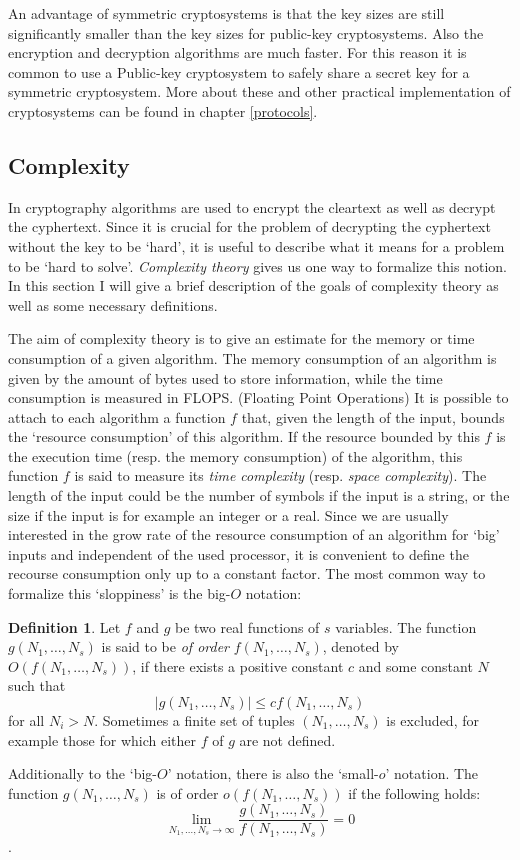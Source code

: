 \documentclass{article}
\numberwithin{equation}{section}
\theoremstyle{definition}
\newtheorem{definition}[theorem]{Definition}
\begin{document}
An advantage of symmetric cryptosystems is that the key sizes are still significantly smaller than the key sizes for public-key cryptosystems. Also the encryption and decryption algorithms are much faster. For this reason it is common to use a Public-key cryptosystem to safely share a secret key for a symmetric cryptosystem. More about these and other practical implementation of cryptosystems can be found in chapter \ref{protocols}.



\subsection{Complexity}
In cryptography algorithms are used to encrypt the cleartext as well as decrypt the cyphertext. Since it is crucial for the problem of decrypting the cyphertext without the key to be `hard', it is useful to describe what it means for a problem to be `hard to solve'. \emph{Complexity theory} gives us one way to formalize this notion. In this section I will give a brief description of the goals of complexity theory as well as some necessary definitions.\par 
The aim of complexity theory is to give an estimate for the memory or time consumption of a given algorithm. The memory consumption of an algorithm is given by the amount of bytes used to store information, while the time consumption is measured in FLOPS. (Floating Point Operations) It is possible to attach to each algorithm a function $f$ that, given the length of the input, bounds the `resource consumption' of this algorithm. If the resource bounded by this $f$ is the execution time (resp. the memory consumption) of the algorithm, this function $f$ is said to measure its \emph{time complexity} (resp. \emph{space complexity}). The length of the input could be the number of symbols if the input is a string, or the size if the input is for example an integer or a real. Since we are usually interested in the grow rate of the resource consumption of an algorithm for `big' inputs and independent of the used processor, it is convenient to define the recourse consumption only up to a constant factor. The most common way to formalize this `sloppiness' is the big-$O$ notation:

\begin{definition}
Let $f$ and $g$ be two real functions of $s$ variables. The function $g(N_1,\ldots,N_s)$ is said to be \emph{of order} $f(N_1,\ldots,N_s)$, denoted by $O(f(N_1,\ldots,N_s))$, if there exists a positive constant $c$ and some constant $N$ such that $$|g(N_1,\ldots,N_s)|\leq cf(N_1,\ldots,N_s)$$ for all $N_i > N$. Sometimes a finite set of tuples $(N_1,\ldots,N_s)$ is excluded, for example those for which either $f$ of $g$ are not defined.\par
Additionally to the `big-$O$' notation, there is also the `small-$o$' notation. The function $g(N_1,\ldots,N_s)$ is of order $o(f(N_1,\ldots,N_s))$ if the following holds: $$\lim_{N_1,\ldots,N_s \rightarrow \infty} \frac{g(N_1,\ldots,N_s)}{f(N_1,\ldots,N_s)} = 0$$.
\end{definition}
\end{document}
